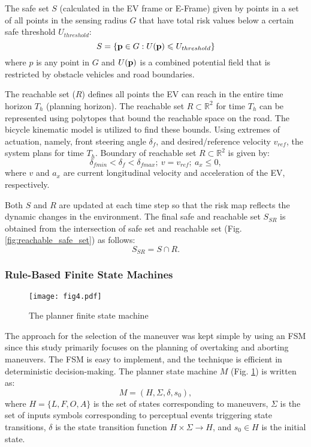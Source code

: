 \documentclass[letterpaper, 10 pt, conference]{ieeeconf}
\begin{document}
The safe set $S$ (calculated in the EV frame or E-Frame) given by points in a set of all points in the sensing radius $G$ that have total risk values below a certain safe threshold $U_{threshold}$:
\begin{equation}
S = \{\textbf{\text{p}} \in G : U(\textbf{\text{p}}) \leqslant U_{threshold} \}
\end{equation}
where $p$ is any point in $G$ and $U(\textbf{\text{p}})$ is a combined potential field that is restricted by obstacle vehicles and road boundaries.\

The reachable set ($R$) defines all points the EV can reach in the entire time horizon \textit{$T_h$} (planning horizon). The reachable set $R \subset \mathbb{R}^{2}$ for time \textit{$T_h$} can be represented using polytopes that bound the reachable space on the road. The bicycle kinematic model \cite{kongKinematicDynamicVehicle2015a} is utilized to find these bounds. Using extremes of actuation, namely, front steering angle \textit{$\delta_f$}, and desired/reference velocity $v_{ref}$, the system plans for time \textit{$T_h$}. Boundary of reachable set $R \subset \mathbb{R}^{2}$ is given by:
\begin{equation} \label{reachble1}
\delta _{fmin}<\delta _{f}<\delta _{fmax} ;\
v =  v_{ref};\
a_x \leq 0,
\end{equation}
where $v$ and $a_x$ are current longitudinal velocity and acceleration of the EV, respectively.\

Both $S$ and $R$ are updated at each time step so that the risk map reflects the dynamic changes in the environment. The final safe and reachable set $S_{SR}$ is obtained from the intersection of safe set and reachable set (Fig. \ref{fig:reachable_safe_set}) as follows:
\begin{equation} \label{Fpot}
S_{SR} = S\cap R.
\end{equation}

\subsubsection{Rule-Based Finite State Machines}

\label{section:FSM}
\begin{figure}[!t]
    \texttt{[image: fig4.pdf]}
    \centering
    \caption{The planner finite state machine}   
    \label{flowchart}
\end{figure}

The approach for the selection of the maneuver was kept simple by using an FSM since this study primarily focuses on the planning of overtaking and aborting maneuvers. The FSM is easy to implement, and the technique is efficient in deterministic decision-making. The planner state machine $M$ (Fig. \ref{flowchart}) is written as:
\begin{equation}
M = (H, \Sigma, \delta, s_0), 
\end{equation}
where $H= \{L, F, O, A\}$ is the set of states corresponding to maneuvers, $\Sigma$ is the set of inputs symbols corresponding to perceptual events triggering state transitions, $\delta$ is the state transition function $H  \times \Sigma \rightarrow H$, and $s_0\in H$ is the initial state.\
\end{document}
